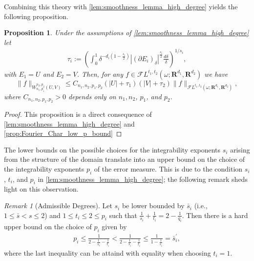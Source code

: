 \documentclass[a4paper]{article}
\newcommand{\rr}[1]{\mathbf{R}^{#1}}
\newcommand{\rrI}{\rr{d_1}}
\newcommand{\rrII}{\rr{d_2}}
\newcommand{\norm}[2]{\|#1\|_{#2}}
\newcommand{\F}[0]{\mathscr{F}}
\newcommand{\FL}[1]{\F L^{#1}}
\numberwithin{equation}{section}
\newtheorem{proposition}[theorem]{Proposition}
\theoremstyle{remark}
\newtheorem{remark}[theorem]{Remark}
\begin{document}
Combining this theory with \cref{lem:smoothness_lemma_high_degree} yields the following proposition.
\begin{proposition}
    Under the assumptions of \cref{lem:smoothness_lemma_high_degree}
    let
    \begin{align*}
    \tau_i:=\left(\int_0^1 \delta^{-d_i\left(1-\frac{s_i}{2}\right)}\left|(\partial E_i)_\delta\right|^{\frac{s_i}{2}} \frac{d \delta}{\delta}\right)^{1 / s_i},
    \end{align*}
    with $E_1=U$ and $E_2=V$.
	Then, for any
    $f\in\FL{t_1,t_2}(\omega;\rrI,\rrII)$
    we have
	\begin{equation}\label{res:high_degree_volume_bound}
		\norm{f}{W_{n_1,p_1}^{n_2, p_2}(U, V)}
        \leq
        C_{n_1,n_2,p_1,p_2}
        \left( |U| +\tau_1\right)
        \left( |V| +\tau_2\right)
        \norm{f}{\FL{t_1,t_2}(\omega;\rrI,\rrII)},
	\end{equation}
    where $C_{n_1,n_2,p_1,p_2}>0$ depends only on $n_1, n_2$, $p_1$, and $p_2$. 
\end{proposition}

\begin{proof}
    This proposition is a direct consequence of \cref{lem:smoothness_lemma_high_degree} and \cref{prop:Fourier_Char_low_p_bound}
\end{proof}

The lower bounds on the possible choices
for the integrability exponents $s_i$
arising from the structure of the domain
translate into an upper bound on the choice of the
integrability exponents $p_i$ of the error measure.
This is due to the condition
\(s_i\), \(t_i\), and \(p_i\)
in \cref{lem:smoothness_lemma_high_degree};
the following remark sheds light on this observation.
\begin{remark}[Admissible Degrees]
    Let $s_i$ be lower bounded by $\bar{s}_i$ (i.e., $1\leq\bar{s}< s\leq 2$) and \(1\leq t_i\leq 2\leq p_i\) such that \(\frac{1}{s_i}+\frac{1}{t_i}= 2-\frac{1}{q_i}\).
    Then there is a hard upper bound on the choice of \(p_i\) given by
    \begin{align*}
        p_i
        \leq \frac{1}{2-\frac{1}{s_i}-\frac{1}{t_i}}
        <    \frac{1}{2-\frac{1}{\bar{s}_i}-\frac{1}{t_i}}
        \leq \frac{1}{1-\frac{1}{\bar{s}_i}}
        =\bar{s}_i^\prime,
    \end{align*}
    where the last inequality can be attaind with equality when choosing $t_i=1$.
\end{remark}
\end{document}
